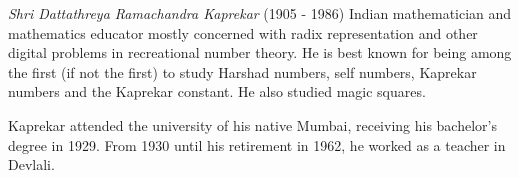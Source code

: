 \documentclass[12pt]{article}
\begin{document}
{\em Shri Dattathreya Ramachandra Kaprekar} (1905 - 1986) Indian mathematician and mathematics educator mostly concerned with radix representation and other digital problems in recreational number theory. He is best known for being among the first (if not the first) to study Harshad numbers, self numbers, Kaprekar numbers and the Kaprekar constant. He also studied magic squares.

Kaprekar attended the university of his native Mumbai, receiving his bachelor's degree in 1929. From 1930 until his retirement in 1962, he worked as a teacher in Devlali.
\end{document}
